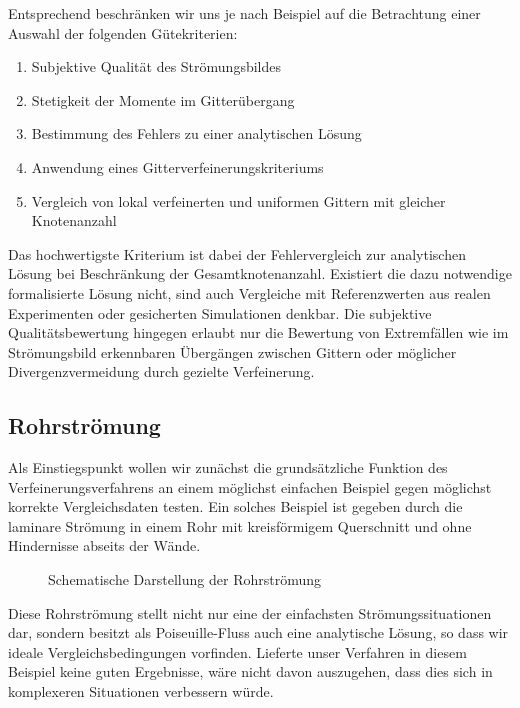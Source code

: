 Entsprechend beschränken wir uns je nach Beispiel auf die Betrachtung einer Auswahl der folgenden Gütekriterien:
\begin{enumerate}
	\item Subjektive Qualität des Strömungsbildes
	\item Stetigkeit der Momente im Gitterübergang
	\item Bestimmung des Fehlers zu einer analytischen Lösung
	\item Anwendung eines Gitterverfeinerungskriteriums
	\item Vergleich von lokal verfeinerten und uniformen Gittern mit gleicher Knotenanzahl
\end{enumerate}

Das hochwertigste Kriterium ist dabei der Fehlervergleich zur analytischen Lösung bei Beschränkung der Gesamtknotenanzahl. Existiert die dazu notwendige formalisierte Lösung nicht, sind auch Vergleiche mit Referenzwerten aus realen Experimenten oder gesicherten Simulationen denkbar. Die subjektive Qualitätsbewertung hingegen erlaubt nur die Bewertung von Extremfällen wie im Strömungsbild erkennbaren Übergängen zwischen Gittern oder möglicher Divergenzvermeidung durch gezielte Verfeinerung.

\newpage
\subsection{Rohrströmung}

Als Einstiegspunkt wollen wir zunächst die grundsätzliche Funktion des Verfeinerungsverfahrens an einem möglichst einfachen Beispiel gegen möglichst korrekte Vergleichsdaten testen. Ein solches Beispiel ist gegeben durch die laminare Strömung in einem Rohr mit kreisförmigem Querschnitt und ohne Hindernisse abseits der Wände.

\begin{figure}[h]
\centering

\caption{Schematische Darstellung der Rohrströmung}
\label{fig:PoiseuilleOverview}
\end{figure}

Diese Rohrströmung stellt nicht nur eine der einfachsten Strömungssituationen dar, sondern besitzt als Poiseuille-Fluss auch eine analytische Lösung, so dass wir ideale Vergleichsbedingungen vorfinden. Lieferte unser Verfahren in diesem Beispiel keine guten Ergebnisse, wäre nicht davon auszugehen, dass dies sich in komplexeren Situationen verbessern würde.

